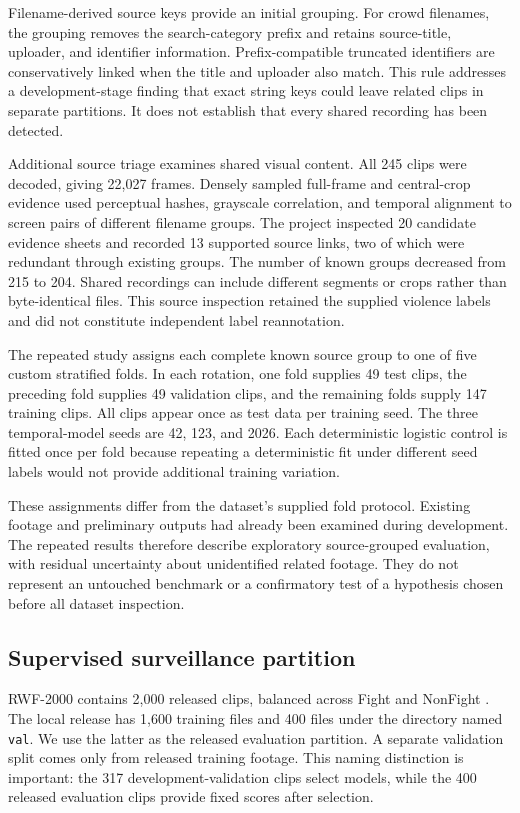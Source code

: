 \documentclass[journal]{IEEEtai}
\begin{document}
Filename-derived source keys provide an initial grouping. For crowd filenames, the grouping removes the search-category prefix and retains source-title, uploader, and identifier information. Prefix-compatible truncated identifiers are conservatively linked when the title and uploader also match. This rule addresses a development-stage finding that exact string keys could leave related clips in separate partitions. It does not establish that every shared recording has been detected.

Additional source triage examines shared visual content. All 245 clips were decoded, giving 22,027 frames. Densely sampled full-frame and central-crop evidence used perceptual hashes, grayscale correlation, and temporal alignment to screen pairs of different filename groups. The project inspected 20 candidate evidence sheets and recorded 13 supported source links, two of which were redundant through existing groups. The number of known groups decreased from 215 to 204. Shared recordings can include different segments or crops rather than byte-identical files. This source inspection retained the supplied violence labels and did not constitute independent label reannotation.

The repeated study assigns each complete known source group to one of five custom stratified folds. In each rotation, one fold supplies 49 test clips, the preceding fold supplies 49 validation clips, and the remaining folds supply 147 training clips. All clips appear once as test data per training seed. The three temporal-model seeds are 42, 123, and 2026. Each deterministic logistic control is fitted once per fold because repeating a deterministic fit under different seed labels would not provide additional training variation.

These assignments differ from the dataset's supplied fold protocol. Existing footage and preliminary outputs had already been examined during development. The repeated results therefore describe exploratory source-grouped evaluation, with residual uncertainty about unidentified related footage. They do not represent an untouched benchmark or a confirmatory test of a hypothesis chosen before all dataset inspection.

\subsection{Supervised surveillance partition}
RWF-2000 contains 2,000 released clips, balanced across Fight and NonFight \cite{cheng2020}. The local release has 1,600 training files and 400 files under the directory named \texttt{val}. We use the latter as the released evaluation partition. A separate validation split comes only from released training footage. This naming distinction is important: the 317 development-validation clips select models, while the 400 released evaluation clips provide fixed scores after selection.
\end{document}
